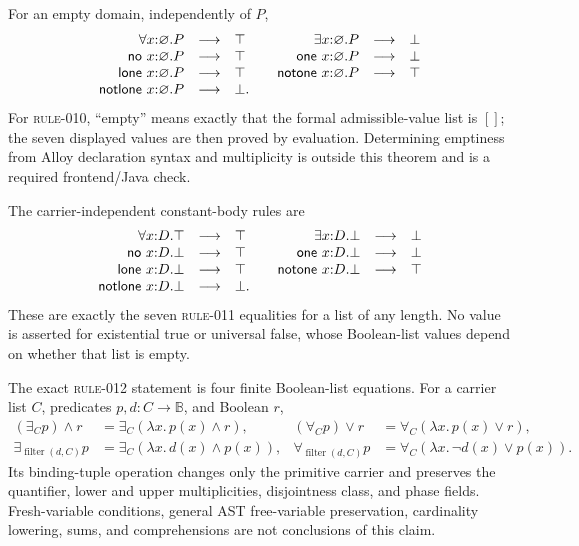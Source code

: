 For an empty domain, independently of $P$,
\[
\begin{array}{rcl@{\qquad}rcl}
 \forall x{:}\varnothing.P&\longrightarrow&\top &
 \exists x{:}\varnothing.P&\longrightarrow&\bot\\
 \mathsf{no}\ x{:}\varnothing.P&\longrightarrow&\top &
 \mathsf{one}\ x{:}\varnothing.P&\longrightarrow&\bot\\
 \mathsf{lone}\ x{:}\varnothing.P&\longrightarrow&\top &
 \mathsf{notone}\ x{:}\varnothing.P&\longrightarrow&\top\\
 \mathsf{notlone}\ x{:}\varnothing.P&\longrightarrow&\bot.&&
\end{array}
\]
For \textsc{rule-010}, ``empty'' means exactly that the formal admissible-value
list is $[]$; the seven displayed values are then proved by evaluation.
Determining emptiness from Alloy declaration syntax and multiplicity is outside
this theorem and is a required frontend/Java check.

The carrier-independent constant-body rules are
\[
\begin{array}{rcl@{\qquad}rcl}
 \forall x{:}D.\top&\longrightarrow&\top &
 \exists x{:}D.\bot&\longrightarrow&\bot\\
 \mathsf{no}\ x{:}D.\bot&\longrightarrow&\top &
 \mathsf{one}\ x{:}D.\bot&\longrightarrow&\bot\\
 \mathsf{lone}\ x{:}D.\bot&\longrightarrow&\top &
 \mathsf{notone}\ x{:}D.\bot&\longrightarrow&\top\\
 \mathsf{notlone}\ x{:}D.\bot&\longrightarrow&\bot.&&
\end{array}
\]
These are exactly the seven \textsc{rule-011} equalities for a list of any
length.  No value is asserted for existential true or universal false, whose
Boolean-list values depend on whether that list is empty.

The exact \textsc{rule-012} statement is four finite Boolean-list equations.
For a carrier list $C$, predicates $p,d:C\to\mathbb B$, and Boolean $r$,
\begin{align*}
 (\exists_C p)\land r&=\exists_C(\lambda x.\,p(x)\land r),&
 (\forall_C p)\lor r&=\forall_C(\lambda x.\,p(x)\lor r),\\
 \exists_{\operatorname{filter}(d,C)}p
   &=\exists_C(\lambda x.\,d(x)\land p(x)),&
 \forall_{\operatorname{filter}(d,C)}p
   &=\forall_C(\lambda x.\,\neg d(x)\lor p(x)).
\end{align*}
Its binding-tuple operation changes only the primitive carrier and preserves
the quantifier, lower and upper multiplicities, disjointness class, and phase
fields.  Fresh-variable conditions, general AST free-variable preservation,
cardinality lowering, sums, and comprehensions are not conclusions of this
claim.


